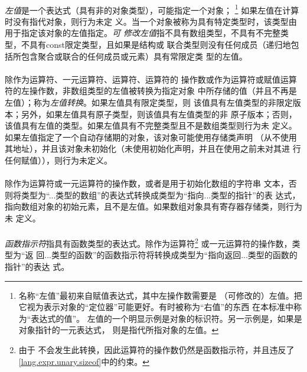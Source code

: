 {                                             
\paragraph{}
\textit{左值}是一个表达式（具有非的对象类型），可能指定一个对象；
\footnote{名称``左值''最初来自赋值表达式，其中左操作数需要是
（可修改的）左值。把它视为表示对象的``定位器''可能更好。有时被称为``右值''的东西
在本标准中称为``表达式的值''。\linebreak
左值的一个明显示例是对象的标识符。另一示例是，如果是对象指针的一元表达式，
则是指代所指对象的左值。} 如果左值在计算时没有指代对象，则行为未定
义。当一个对象被称为具有特定类型时，该类型由用于指定该对象的左值指定。\textit{可
修改左值}指不具有数组类型，不具有不完整类型，不具有const限定类型，且如果是结构或
联合类型则没有任何成员（递归地包括所包含聚合或联合的任何成员或元素）具有常限定类
型的左值。

\paragraph{}
除作为运算符、一元\tm{\&}运算符、\tm{++}运算符、\tm{\dsh\dsh}运算符的
操作数或作为运算符或赋值运算符的左操作数，非数组类型的左值被转换为指定对象
中所存储的值（并且不再是左值）；称为\textit{左值转换}。如果左值具有限定类型，则
该值具有左值类型的非限定版本；另外，如果左值具有原子类型，则该值具有左值类型的非
原子版本；否则，该值具有左值的类型。如果左值具有不完整类型且不是数组类型则行为未
定义。如果左值指定了一个自动存储期的对象，该对象可能使用存储类声明
（从不使用其地址），并且该对象未初始化（未使用初始化声明，并且在使用之前未对其进
行任何赋值）），则行为未定义。

\paragraph{}
除作为运算符或一元\tm{\&}运算符的操作数，或者是用于初始化数组的字符串
文本，否则将类型为``...类型的数组''的表达式转换成类型为``指向...类型的指针''的表
达式，指向数组对象的初始元素，且不是左值。如果数组对象具有寄存器存储类，则行为未
定义。

\paragraph{}
\textit{函数指示符}指具有函数类型的表达式。除作为运算符\footnote{由于
不会发生此转换，因此运算符的操作数仍然是函数指示符，并且违反了
\ref{lang.expr.unary.sizeof}中的约束。} 或一元\tm{\&}运算符的操作数，类型为``返
回...类型的函数''的函数指示符将转换成类型为``指向返回...类型的函数的指针''的表达
式。

}
